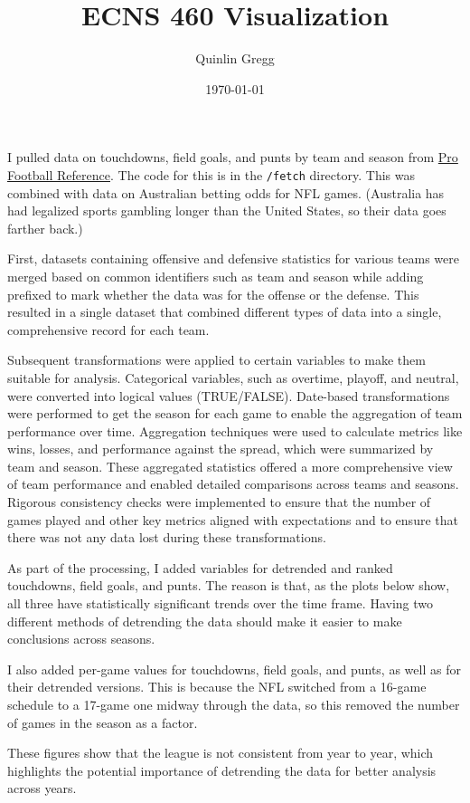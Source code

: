 \documentclass{article}
\title{ECNS 460 Visualization}
\author{Quinlin Gregg}
\date{\today}
\begin{document}
\maketitle

I pulled data on touchdowns, field goals, and punts by team and season from
\href{https://www.pro-football-reference.com}{Pro Football Reference}. The code for this
is in the \texttt{/fetch} directory. This was combined with data on Australian betting odds
for NFL games. (Australia has had legalized sports gambling longer than the United States,
so their data goes farther back.)

First, datasets containing offensive and defensive statistics for various teams were merged based on common identifiers such as team and season while adding prefixed to mark whether the data was for the offense or the defense. This resulted in a single dataset that combined different types of data into a single, comprehensive record for each team.

Subsequent transformations were applied to certain variables to make them suitable for analysis. Categorical variables, such as overtime, playoff, and neutral, were converted into logical values (TRUE/FALSE). Date-based transformations were performed to get the season for each game to enable the aggregation of team performance over time. Aggregation techniques were used to calculate metrics like wins, losses, and performance against the spread, which were summarized by team and season. These aggregated statistics offered a more comprehensive view of team performance and enabled detailed comparisons across teams and seasons. Rigorous consistency checks were implemented to ensure that the number of games played and other key metrics aligned with expectations and to ensure that there was not any data lost during these transformations.

As part of the processing, I added variables for detrended and ranked touchdowns,
field goals, and punts. The reason is that, as the plots below show, all three have 
statistically significant trends over the time frame. Having two different methods of 
detrending the data should make it easier to make conclusions across seasons.

I also added per-game values for touchdowns, field goals, and punts, as well as for their
detrended versions. This is because the NFL switched from a 16-game schedule to a 17-game one 
midway through the data, so this removed the number of games in the season as a factor.

These figures show that the league is not consistent from year to year, which highlights the 
potential importance of detrending the data for better analysis across years.
\end{document}
